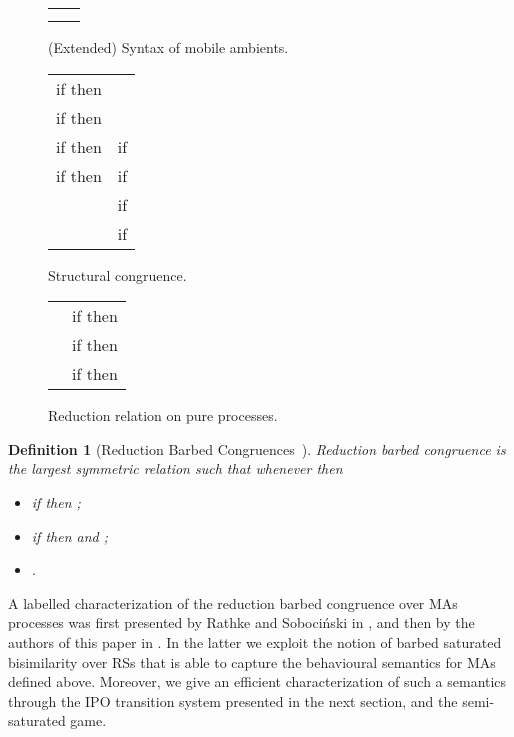 \documentclass[copyright,creativecommons]{eptcs}
\newcommand{\<}{\langle}
\renewcommand{\>}{\rangle}
\newtheorem{definition}{Definition}{}
\begin{document}
\begin{figure}[!t]
\center
\begin{tabular}{p{7.3 cm} p{5 cm}}
\hline \\
 &     \bigskip\\
\hline
\end{tabular}
\caption{(Extended) Syntax of mobile ambients.}
\label{syntax}
\vspace{3mm}
\begin{tabular}{p{6 cm} p{6 cm}}
\hline
if  then  & \\
if  then  & \\
if  then  &  \hspace{3mm} if \\
if  then  &  \hspace{3mm} if \\
 &  \hspace{4mm} if \\
 &  \hspace{.75mm}if \\
\hline
\end{tabular}
\caption{Structural congruence.}
\label{cong}
\vspace{3mm}
\begin{tabular}{p{6 cm} p{6 cm}}
\hline
 & if   then  \\
 & if    then   \\
 & if    then  \\
\hline
\end{tabular}
\caption{Reduction relation on pure processes.}
\label{reduction}
\end{figure}

\begin{definition} [Reduction Barbed Congruences~\cite{PawelAmbient}]
\label{StrongCong}
\emph{Reduction barbed congruence}  is the largest symmetric relation  such that whenever
 then
\begin{itemize}
\item if  then ;
\item if  then  and ;
\item .
\end{itemize}
\end{definition}

A labelled characterization of the reduction barbed congruence over
MAs processes was first presented by Rathke and Soboci\'nski in
\cite{PawelAmbient}, and then by the authors of this paper in
\cite{BGMFOSSACS09}.  In the latter we exploit the notion of barbed
saturated bisimilarity over RSs that is able to capture the
behavioural semantics for MAs defined above.  Moreover, we give an
efficient characterization of such a semantics through the IPO
transition system presented in the next section, and the
semi-saturated game.
\end{document}
